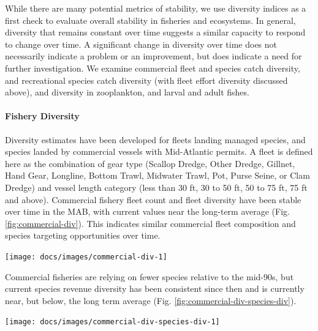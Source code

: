 \documentclass[
  10pt,
]{article}
\let\origfigure\figure
\let\endorigfigure\endfigure
\renewenvironment{figure}[1][2] {
    \expandafter\origfigure\expandafter[H]
} {
    \endorigfigure
}
\begin{document}
While there are many potential metrics of stability, we use diversity
indices as a first check to evaluate overall stability in fisheries and
ecosystems. In general, diversity that remains constant over time
suggests a similar capacity to respond to change over time. A
significant change in diversity over time does not necessarily indicate
a problem or an improvement, but does indicate a need for further
investigation. We examine commercial fleet and species catch diversity,
and recreational species catch diversity (with fleet effort diversity
discussed above), and diversity in zooplankton, and larval and adult
fishes.

\hypertarget{fishery-diversity}{%
\paragraph{Fishery Diversity}\label{fishery-diversity}}

Diversity estimates have been developed for fleets landing managed
species, and species landed by commercial vessels with Mid-Atlantic
permits. A fleet is defined here as the combination of gear type
(Scallop Dredge, Other Dredge, Gillnet, Hand Gear, Longline, Bottom
Trawl, Midwater Trawl, Pot, Purse Seine, or Clam Dredge) and vessel
length category (less than 30 ft, 30 to 50 ft, 50 to 75 ft, 75 ft and
above). Commercial fishery fleet count and fleet diversity have been
stable over time in the MAB, with current values near the long-term
average (Fig. \ref{fig:commercial-div}). This indicates similar
commercial fleet composition and species targeting opportunities over
time.

\begin{figure}

{\centering \texttt{[image: docs/images/commercial-div-1]} 

}

\caption{Commercial fleet count and diversity in the Mid-Atlantic.}\label{fig:commercial-div}
\end{figure}

Commercial fisheries are relying on fewer species relative to the
mid-90s, but current species revenue diversity has been consistent since
then and is currently near, but below, the long term average (Fig.
\ref{fig:commercial-div-species-div}).

\begin{figure}

{\centering \texttt{[image: docs/images/commercial-div-species-div-1]} 

}

\caption{Species revenue diversity in the Mid-Atlantic.}\label{fig:commercial-div-species-div}
\end{figure}
\end{document}
